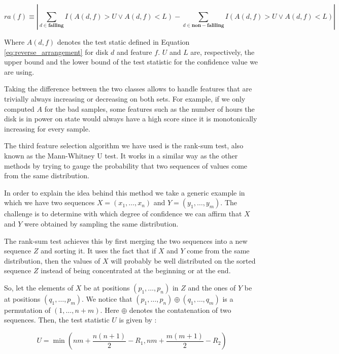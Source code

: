 \begin{equation}
  ra(f) \equiv \left| \sum_{d \in \mathbf{failing}} I(A(d, f) > U \lor A(d, f) < L) - \sum_{d \in \mathbf{non-faliling}} I(A(d, f) > U \lor A(d, f) < L) \right|
\end{equation}

Where $A(d, f)$ denotes the test static defined in Equation \ref{eq:reverse_arrangement} for disk $d$ and feature $f$.
$U$ and $L$ are, respectively, the upper bound and the lower bound of the test statistic for the confidence value we are using.

Taking the difference between the two classes allows to handle features that are trivially always increasing or decreasing on both sets.
For example, if we only computed $A$ for the bad samples, some features such as the number of hours the disk is in power on state would always have a high score since it is monotonically increasing for every sample.

The third feature selection algorithm we have used is the rank-sum test, also known as the Mann-Whitney U test.
It works in a similar way as the other methods by trying to gauge the probability that two sequences of values come from the same distribution.

In order to explain the idea behind this method we take a generic example in which we have two sequences $X = (x_1,\dots,x_n)$ and $Y = (y_1,\dots,y_m)$.
The challenge is to determine with which degree of confidence we can affirm that $X$ and $Y$ were obtained by sampling the same distribution.

The rank-sum test achieves this by first merging the two sequences into a new sequence $Z$ and sorting it.
It uses the fact that if $X$ and $Y$ come from the same distribution, then the values of $X$ will probably be well distributed on the sorted sequence $Z$ instead of being concentrated at the beginning or at the end.

So, let the elements of $X$ be at positions $(p_1, \dots, p_n)$ in $Z$ and the ones of $Y$ be at positions $(q_1, \dots, p_m)$.
We notice that $(p_1, \dots, p_n) \oplus (q_1, \dots, q_m)$ is a permutation of $(1,\dots,n+m)$.
Here $\oplus$ denotes the contatenation of two sequences.
Then, the test statistic $U$ is given by \cite{macfarland2016mann}:

\begin{equation}
  U = \min\left(nm + \dfrac{n(n+1)}{2} - R_1, nm + \dfrac{m(m+1)}{2} - R_2\right)
\end{equation}


